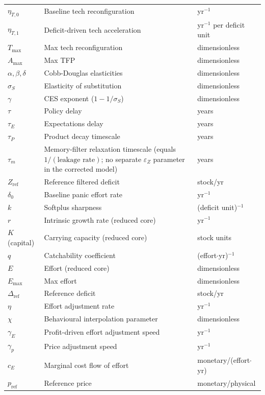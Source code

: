 \documentclass[twocolumn,10pt]{article}
\begin{document}
\begin{table}[t]
\begin{tabularx}{\textwidth}{l X l}
\(\eta_{T,0}\) & Baseline tech reconfiguration & yr\(^{-1}\) \\
\(\eta_{T,1}\) & Deficit-driven tech acceleration & yr\(^{-1}\) per deficit unit \\
\(T_{\max}\) & Max tech reconfiguration & dimensionless \\
\(A_{\max}\) & Max TFP & dimensionless \\
\(\alpha,\beta,\delta\) & Cobb-Douglas elasticities & dimensionless \\
\(\sigma_S\) & Elasticity of substitution & dimensionless \\
\(\gamma\) & CES exponent (\(1-1/\sigma_S\)) & dimensionless \\
\(\tau\) & Policy delay & years \\
\(\tau_E\) & Expectations delay & years \\
\(\tau_P\) & Product decay timescale & years \\
\(\tau_m\) & Memory-filter relaxation timescale (equals $1/(\text{leakage rate})$; no separate $\varepsilon_Z$ parameter in the corrected model) & years \\
\(Z_{\text{ref}}\) & Reference filtered deficit & stock/yr \\
\(\delta_0\) & Baseline panic effort rate & yr\(^{-1}\) \\
\(k\) & Softplus sharpness & (deficit unit)\(^{-1}\) \\
\(r\) & Intrinsic growth rate (reduced core) & yr\(^{-1}\) \\
\(K\) (capital) & Carrying capacity (reduced core) & stock units \\
\(q\) & Catchability coefficient & (effort\(\cdot\)yr)\(^{-1}\) \\
\(E\) & Effort (reduced core) & dimensionless \\
\(E_{\max}\) & Max effort & dimensionless \\
\(\Delta_{\text{ref}}\) & Reference deficit & stock/yr \\
\(\eta\) & Effort adjustment rate & yr\(^{-1}\) \\
\(\chi\) & Behavioural interpolation parameter & dimensionless \\
\(\gamma_E\) & Profit-driven effort adjustment speed & yr\(^{-1}\) \\
\(\gamma_p\) & Price adjustment speed & yr\(^{-1}\) \\
\(c_E\) & Marginal cost flow of effort & monetary/(effort\(\cdot\)yr) \\
\(p_{\text{ref}}\) & Reference price & monetary/physical \\

\end{tabularx}
\end{table}
\end{document}
